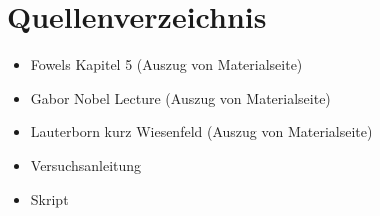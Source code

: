 \section{Quellenverzeichnis}
\begin{itemize}
\item Fowels Kapitel 5 (Auszug von Materialseite)
\item Gabor Nobel Lecture (Auszug von Materialseite)
\item Lauterborn kurz Wiesenfeld (Auszug von Materialseite)
\item Versuchsanleitung
\item Skript
\end{itemize}